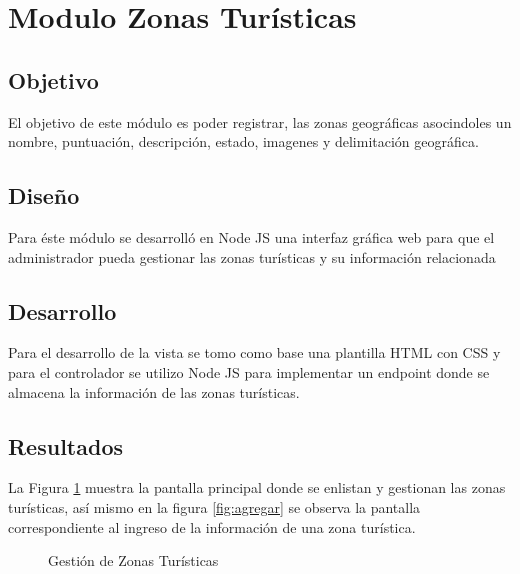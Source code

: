 \section{Modulo Zonas Turísticas}

\subsection{Objetivo}
El objetivo de este módulo es poder registrar, las zonas geográficas asocindoles un nombre, puntuación, descripción, estado, imagenes y delimitación geográfica.

\subsection{Diseño}

Para éste módulo se desarrolló en Node JS una interfaz gráfica web para que el administrador pueda gestionar las zonas turísticas y su información relacionada

\subsection{Desarrollo}

Para el desarrollo de la vista se tomo como base una plantilla HTML con CSS y para el controlador se utilizo Node JS para implementar un endpoint donde se almacena la información de las zonas turísticas.

\subsection{Resultados}

La Figura \ref{fig:zonas} muestra la pantalla principal donde se enlistan y gestionan las zonas turísticas, así mismo en la figura \ref{fig:agregar} se observa la pantalla correspondiente al ingreso de la información de una zona turística.\\

\begin{figure}[htbp]
	\begin{center}
		\caption{Gestión de Zonas Turísticas}
		\label{fig:zonas}
	\end{center}
\end{figure}

